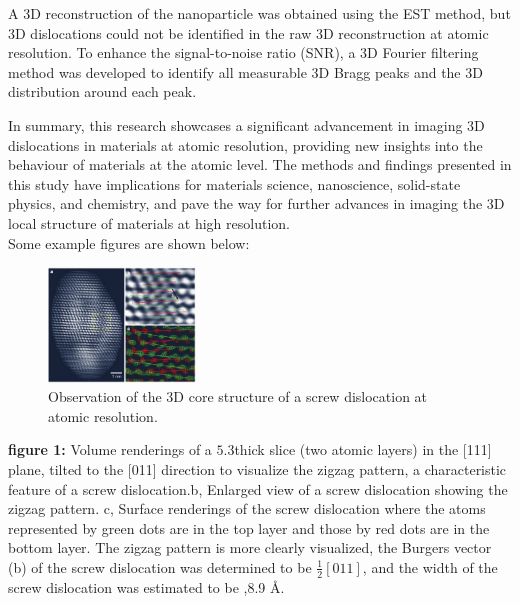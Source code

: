 \documentclass[12pt, a4paper, twocolumn]{article}
\begin{document}
A 3D reconstruction of the nanoparticle was obtained using the EST method, but 3D dislocations could not be identified in the raw 3D reconstruction at atomic resolution. To enhance the signal-to-noise ratio (SNR), a 3D Fourier filtering method was developed to identify all measurable 3D Bragg peaks and the 3D distribution around each peak.\par
In summary, this research showcases a significant advancement in imaging 3D dislocations in materials at atomic resolution, providing new insights into the behaviour of materials at the atomic level. The methods and findings presented in this study have implications for materials science, nanoscience, solid-state physics, and chemistry, and pave the way for further advances in imaging the 3D local structure of materials at high resolution.\\
Some example figures are shown below:\par
\begin{figure}[h]
	\includegraphics[width=0.35\textwidth]{3d_di.png}
	\caption{Observation of the 3D core structure of a screw dislocation at	atomic resolution.
	}
\end{figure}
\textbf{figure 1:} Volume renderings of a $5.3 $thick slice (two atomic
layers) in the [111] plane, tilted to the [011] direction
to visualize the zigzag pattern, a characteristic feature of a screw dislocation.b, Enlarged view of a screw dislocation showing the zigzag pattern. c, Surface
renderings of the screw dislocation where the atoms represented by green dots are in the top layer and those by red dots are in the bottom layer. The zigzag pattern is more clearly visualized, the Burgers vector (b) of the screw dislocation was determined to be $\frac{1}{2}[011]$, and the width of the screw dislocation was estimated to be ,8.9 Å.
\par
\end{document}
